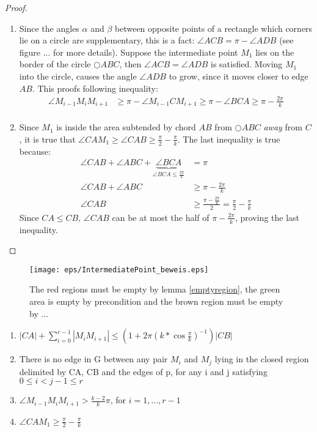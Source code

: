 \begin{proof}
\begin{enumerate}
\item Since the angles $\alpha $ and $\beta $ between opposite points of a rectangle which corners lie on a circle are supplementary, this is a fact: $\angle{ACB}=\pi - \angle{ADB} $ (see figure ... for more details).
Suppose the intermediate point $M_1 $ lies on the border of the circle $\bigcirc{ABC} $, then $\angle{ACB}=\angle{ADB} $ is satisfied.
Moving $M_1 $ into the circle, causes the angle $\angle{ADB} $ to grow, since it moves closer to edge $AB $.
This proofs following inequality:
\begin{equation*}
\begin{split}
 \angle{M_{i-1}M_iM_{i+1}}&\geq \pi - \angle{M_{i-1}CM_{i+1}} \geq \pi - \angle{BCA} \geq \pi - \frac{2\pi}{k}\\
\end{split}
\end{equation*}

\item Since $M_1 $ is inside the area subtended by chord $AB $ from $\bigcirc{ABC} $ \emph{away} from $C $, it is true that $\angle{CAM_1} \geq \angle{CAB} \geq \frac{\pi}{2} -\frac{\pi}{k} $.
The last inequality is true because:
 \begin{equation*}
  \begin{split}
   \angle{CAB}+\angle{ABC}+\underbrace{\angle{BCA}}_{\angle{BCA}\leq \frac{2\pi}{k}}&=\pi\\
   \angle{CAB}+\angle{ABC} &\geq \pi - \frac{2\pi}{k} \\
   \angle{CAB} &\geq \frac{\pi-\frac{2\pi}{k}}{2}=\frac{\pi}{2}-\frac{\pi}{k}
   \end{split} 
\end{equation*}
Since $CA \leq CB $, $\angle{CAB} $ can be at most the half of $\pi - \frac{2\pi}{k} $, proving the last inequality.

\end{enumerate}
\end{proof}

 
\begin{figure}[h!]
\centering
\texttt{[image: eps/IntermediatePoint\_beweis.eps]}
\caption{The red regions must be empty by lemma \ref{emptyregion}, the green area is empty by precondition and the brown region must be empty by ... }
\label{fig:intermediate_point_beweis}
\end{figure}


\begin{enumerate}
\item $|CA| + \sum\nolimits_{i=0}^{r-1} |M_iM_{i+1}| \leq (1+2\pi (k*\cos{\frac{\pi}{k}})^{-1})|CB| $
\item There is no edge in G between any pair $M_i $ and $M_j $ lying in the closed region delimited by CA, CB and the edges of p, for any i and j satisfying $0 \leq i < j-1 \leq r $ 
\item $\angle{M_{i-1}M_iM_{i+1}} > \frac{k-2}{k}\pi $, for $i=1, ..., r-1 $ 
\item $\angle{CAM_1} \geq \frac{\pi}{2}-\frac{\pi}{k} $
\end{enumerate}




